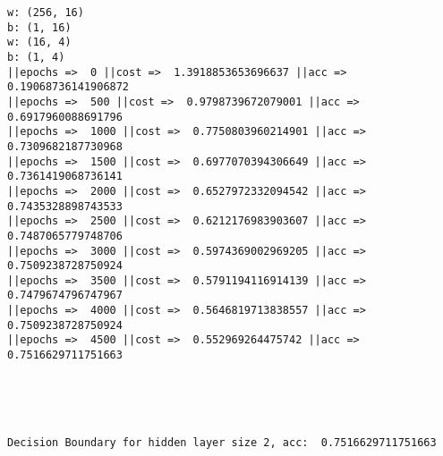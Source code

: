 \documentclass[11pt]{article}
\begin{document}
    \begin{Verbatim}[commandchars=\\\{\}]
w: (256, 16)
b: (1, 16)
w: (16, 4)
b: (1, 4)
||epochs =>  0 ||cost =>  1.3918853653696637 ||acc =>  0.19068736141906872
||epochs =>  500 ||cost =>  0.9798739672079001 ||acc =>  0.6917960088691796
||epochs =>  1000 ||cost =>  0.7750803960214901 ||acc =>  0.7309682187730968
||epochs =>  1500 ||cost =>  0.6977070394306649 ||acc =>  0.7361419068736141
||epochs =>  2000 ||cost =>  0.6527972332094542 ||acc =>  0.7435328898743533
||epochs =>  2500 ||cost =>  0.6212176983903607 ||acc =>  0.7487065779748706
||epochs =>  3000 ||cost =>  0.5974369002969205 ||acc =>  0.7509238728750924
||epochs =>  3500 ||cost =>  0.5791194116914139 ||acc =>  0.7479674796747967
||epochs =>  4000 ||cost =>  0.5646819713838557 ||acc =>  0.7509238728750924
||epochs =>  4500 ||cost =>  0.552969264475742 ||acc =>  0.7516629711751663

    \end{Verbatim}

    \begin{center}
    \end{center}
    { \hspace*{\fill} \\}
    
    \begin{center}
    \end{center}
    { \hspace*{\fill} \\}
    
    \begin{Verbatim}[commandchars=\\\{\}]
Decision Boundary for hidden layer size 2, acc:  0.7516629711751663

    \end{Verbatim}
\end{document}
